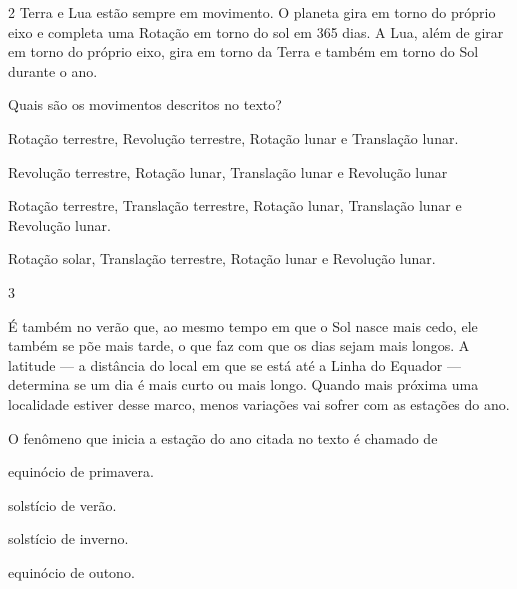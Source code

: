 \pagebreak
\num{2} Terra e Lua estão sempre em movimento. O planeta gira em
torno do próprio eixo e completa uma Rotação em torno do sol em 365
dias. A Lua, além de girar em torno do próprio eixo, gira em torno da
Terra e também em torno do Sol durante o ano.

Quais são os movimentos descritos no texto?

\begin{escolha}
\item Rotação terrestre, Revolução terrestre, Rotação lunar e Translação lunar.

\item Revolução terrestre, Rotação lunar, Translação lunar e Revolução lunar

\item Rotação terrestre, Translação terrestre, Rotação lunar, Translação lunar e Revolução lunar.

\item Rotação solar, Translação terrestre, Rotação lunar e Revolução lunar.
\end{escolha}

\num{3}

\begin{myquote}
É também no verão que, ao mesmo tempo em que o Sol nasce mais cedo, ele
também se põe mais tarde, o que faz com que os dias sejam mais longos. A
latitude — a distância do local em que se está até a Linha do Equador
— determina se um dia é mais curto ou mais longo. Quando mais próxima
uma localidade estiver desse marco, menos variações vai sofrer com as
estações do ano.

\end{myquote}

O fenômeno que inicia a estação do ano citada no texto é chamado de

\begin{minipage}{.5\textwidth}
\begin{escolha}
\item equinócio de primavera.

\item solstício de verão.

\item solstício de inverno.

\item equinócio de outono.
\end{escolha}
\end{minipage}




